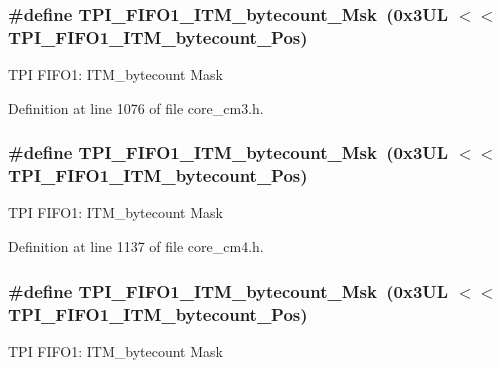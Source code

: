 \subsubsection[{\texorpdfstring{T\+P\+I\+\_\+\+F\+I\+F\+O1\+\_\+\+I\+T\+M\+\_\+bytecount\+\_\+\+Msk}{TPI_FIFO1_ITM_bytecount_Msk}}]{\setlength{\rightskip}{0pt plus 5cm}\#define T\+P\+I\+\_\+\+F\+I\+F\+O1\+\_\+\+I\+T\+M\+\_\+bytecount\+\_\+\+Msk~(0x3\+U\+L $<$$<$ T\+P\+I\+\_\+\+F\+I\+F\+O1\+\_\+\+I\+T\+M\+\_\+bytecount\+\_\+\+Pos)}\hypertarget{group___c_m_s_i_s___t_p_i_gacba2edfc0499828019550141356b0dcb}{}\label{group___c_m_s_i_s___t_p_i_gacba2edfc0499828019550141356b0dcb}
T\+PI F\+I\+F\+O1\+: I\+T\+M\+\_\+bytecount Mask 

Definition at line 1076 of file core\+\_\+cm3.\+h.

\subsubsection[{\texorpdfstring{T\+P\+I\+\_\+\+F\+I\+F\+O1\+\_\+\+I\+T\+M\+\_\+bytecount\+\_\+\+Msk}{TPI_FIFO1_ITM_bytecount_Msk}}]{\setlength{\rightskip}{0pt plus 5cm}\#define T\+P\+I\+\_\+\+F\+I\+F\+O1\+\_\+\+I\+T\+M\+\_\+bytecount\+\_\+\+Msk~(0x3\+U\+L $<$$<$ T\+P\+I\+\_\+\+F\+I\+F\+O1\+\_\+\+I\+T\+M\+\_\+bytecount\+\_\+\+Pos)}\hypertarget{group___c_m_s_i_s___t_p_i_gacba2edfc0499828019550141356b0dcb}{}\label{group___c_m_s_i_s___t_p_i_gacba2edfc0499828019550141356b0dcb}
T\+PI F\+I\+F\+O1\+: I\+T\+M\+\_\+bytecount Mask 

Definition at line 1137 of file core\+\_\+cm4.\+h.

\subsubsection[{\texorpdfstring{T\+P\+I\+\_\+\+F\+I\+F\+O1\+\_\+\+I\+T\+M\+\_\+bytecount\+\_\+\+Msk}{TPI_FIFO1_ITM_bytecount_Msk}}]{\setlength{\rightskip}{0pt plus 5cm}\#define T\+P\+I\+\_\+\+F\+I\+F\+O1\+\_\+\+I\+T\+M\+\_\+bytecount\+\_\+\+Msk~(0x3\+U\+L $<$$<$ T\+P\+I\+\_\+\+F\+I\+F\+O1\+\_\+\+I\+T\+M\+\_\+bytecount\+\_\+\+Pos)}\hypertarget{group___c_m_s_i_s___t_p_i_gacba2edfc0499828019550141356b0dcb}{}\label{group___c_m_s_i_s___t_p_i_gacba2edfc0499828019550141356b0dcb}
T\+PI F\+I\+F\+O1\+: I\+T\+M\+\_\+bytecount Mask 

